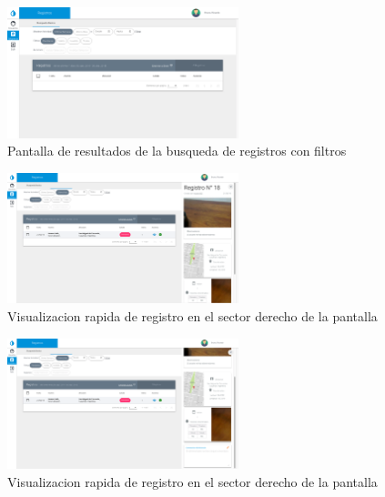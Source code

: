 	
				\begin{figure}
					\centering
						\includegraphics[width=0.6\textwidth]{Screenshots/web/registroListar.png}
								\caption{Pantalla de resultados de la busqueda de registros con filtros}
						\label{fig:busqueda}
				\end{figure}

			
				\begin{figure}
					\centering
						\includegraphics[width=0.6\textwidth]{Screenshots/web/registroVer1.png}
								\caption{Visualizacion rapida de registro en el sector derecho de la pantalla}
				\end{figure}

				\begin{figure}
					\centering
						\includegraphics[width=0.6\textwidth]{Screenshots/web/registroVer2.png}
								\caption{Visualizacion rapida de registro en el sector derecho de la pantalla}

				\end{figure}

